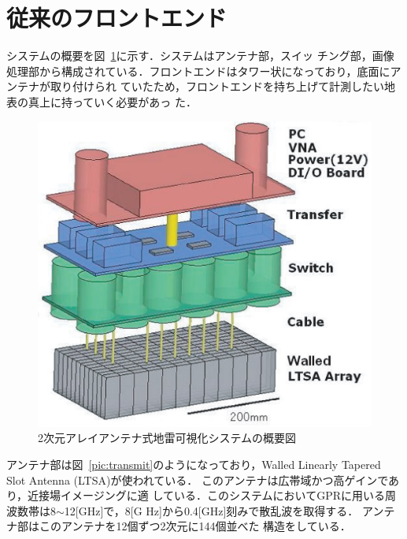 ﻿\documentclass[12pt,oneside]{jsbook}
\begin{document}
\section{従来のフロントエンド}
システムの概要を図~\ref{pic:const_ov}に示す．システムはアンテナ部，スイッ
チング部，画像処理部から構成されている．フロントエンドはタワー状になっており，底面にアンテナが取り付けられ
ていたため，フロントエンドを持ち上げて計測したい地表の真上に持っていく必要があっ
た．
\begin{figure}[hbtp]
\begin{center}
\includegraphics[width = 0.6\hsize]{so1.eps}
\caption{2次元アレイアンテナ式地雷可視化システムの概要図} \label{pic:const_ov} 
\end{center}
\end{figure}

アンテナ部は図~\ref{pic:transmit}のようになっており，Walled Linearly Tapered Slot Antenna (LTSA)\cite{2007SMas}が使われている．
このアンテナは広帯域かつ高ゲインであり，近接場イメージングに適
している．このシステムにおいてGPRに用いる周波数帯は8$\sim$12[GHz]で，8[G
Hz]から0.4[GHz]刻みで散乱波を取得する．
アンテナ部はこのアンテナを12個ずつ2次元に144個並べた
構造をしている．
\end{document}
